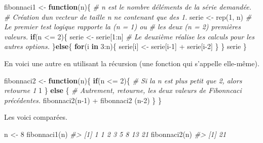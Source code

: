 \documentclass[
]{book}
\newenvironment{Shaded}{}{}
\newcommand{\CommentTok}[1]{\textit{#1}}
\newcommand{\ControlFlowTok}[1]{\textbf{#1}}
\newcommand{\DecValTok}[1]{#1}
\newcommand{\FunctionTok}[1]{#1}
\newcommand{\NormalTok}[1]{#1}
\newcommand{\OtherTok}[1]{#1}
\newcommand{\SpecialCharTok}[1]{#1}
\begin{document}
\begin{Shaded}
\begin{Highlighting}[]
\NormalTok{fibonnaci1 }\OtherTok{\textless{}{-}}  \ControlFlowTok{function}\NormalTok{(n)\{}
  \CommentTok{\# n est le nombre d\textquotesingle{}éléments de la série demandée.}
  \CommentTok{\# Création d\textquotesingle{}un vecteur de taille n ne contenant que des 1.}
\NormalTok{  serie }\OtherTok{\textless{}{-}} \FunctionTok{rep}\NormalTok{(}\DecValTok{1}\NormalTok{, n)}
  \CommentTok{\# Le premier test logique rapporte la (n = 1) ou }
  \CommentTok{\# les deux (n = 2) premières valeurs.}
  \ControlFlowTok{if}\NormalTok{(n }\SpecialCharTok{\textless{}=} \DecValTok{2}\NormalTok{)\{}
\NormalTok{    serie }\OtherTok{\textless{}{-}}\NormalTok{  serie[}\DecValTok{1}\SpecialCharTok{:}\NormalTok{n]}
    \CommentTok{\# Le deuxième réalise les calculs pour les autres options.  }
\NormalTok{  \}}\ControlFlowTok{else}\NormalTok{\{}
    \ControlFlowTok{for}\NormalTok{(i }\ControlFlowTok{in} \DecValTok{3}\SpecialCharTok{:}\NormalTok{n)\{}
\NormalTok{      serie[i] }\OtherTok{\textless{}{-}}\NormalTok{  serie[i}\DecValTok{{-}1}\NormalTok{] }\SpecialCharTok{+}\NormalTok{ serie[i}\DecValTok{{-}2}\NormalTok{]  }
\NormalTok{    \}}
\NormalTok{  \}}
\NormalTok{  serie}
\NormalTok{\}}
\end{Highlighting}
\end{Shaded}

En voici une autre en utilisant la récursion (une fonction qui s'appelle elle-même).

\begin{Shaded}
\begin{Highlighting}[]
\NormalTok{fibonnaci2 }\OtherTok{\textless{}{-}} \ControlFlowTok{function}\NormalTok{(n)\{}
  \ControlFlowTok{if}\NormalTok{(n }\SpecialCharTok{\textless{}=} \DecValTok{2}\NormalTok{)\{}
    \CommentTok{\# Si la n est plus petit que 2, alors retourne 1}
    \DecValTok{1}
\NormalTok{  \} }\ControlFlowTok{else}\NormalTok{ \{}
    \CommentTok{\# Autrement, retourne, les deux valeurs de Fibonncaci précédentes.}
    \FunctionTok{fibonnaci2}\NormalTok{(n}\DecValTok{{-}1}\NormalTok{) }\SpecialCharTok{+} \FunctionTok{fibonnaci2}\NormalTok{ (n}\DecValTok{{-}2}\NormalTok{)}
\NormalTok{  \}}
\NormalTok{\}}
\end{Highlighting}
\end{Shaded}

Les voici comparées.

\begin{Shaded}
\begin{Highlighting}[]
\NormalTok{n }\OtherTok{\textless{}{-}} \DecValTok{8}
\FunctionTok{fibonnaci1}\NormalTok{(n)}
\CommentTok{\#\textgreater{} [1]  1  1  2  3  5  8 13 21}
\FunctionTok{fibonnaci2}\NormalTok{(n)}
\CommentTok{\#\textgreater{} [1] 21}
\end{Highlighting}
\end{Shaded}
\end{document}

